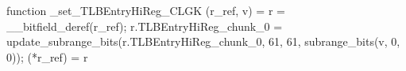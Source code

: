 function _set_TLBEntryHiReg_CLGK (r_ref, v) = {
    r = __bitfield_deref(r_ref);
    r.TLBEntryHiReg_chunk_0 = update_subrange_bits(r.TLBEntryHiReg_chunk_0, 61, 61, subrange_bits(v, 0, 0));
    (*r_ref) = r
}
